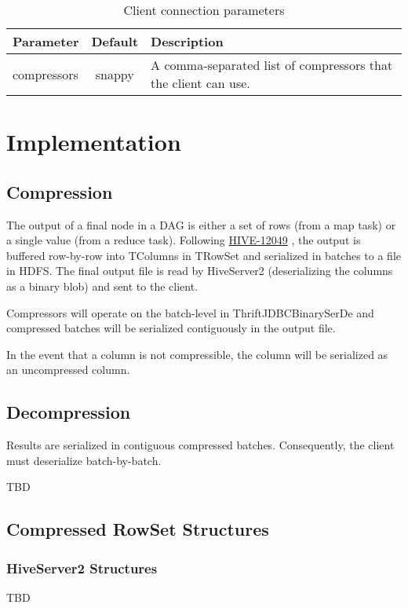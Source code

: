 \documentclass[11pt,a4paper]{article}
\begin{document}
		\begin{table}[H]
			\begin{tabular}{| p{3cm} | c | p{6.5cm} |} \hline
				\textbf{Parameter} & \textbf{Default} & \textbf{Description} \\ \hline
				compressors
				& snappy & A comma-separated list of compressors that the client can use. 
				\\ \hline
			\end{tabular}
			\caption{Client connection parameters}
		\end{table}
		
\section{Implementation}
	
	\subsection{Compression}
		The output of a final node in a DAG is either a set of rows (from a map task) or a single value (from a reduce task).
		Following
		\href{https://issues.apache.org/jira/browse/HIVE-12049}{HIVE-12049}
		, the output is buffered row-by-row into TColumns in TRowSet and serialized in batches to a file in HDFS.
		The final output file is read by HiveServer2 (deserializing the columns as a binary blob) and sent to the client.
		
		Compressors will operate on the batch-level in ThriftJDBCBinarySerDe and compressed batches will be serialized contiguously in the output file. 
		
		In the event that a column is not compressible, the column will be serialized as an uncompressed column.
		
	\subsection{Decompression}
		Results are serialized in contiguous compressed batches. Consequently, the client must deserialize batch-by-batch.
		
		TBD
		
	\subsection{Compressed RowSet Structures}
		\subsubsection{HiveServer2 Structures}
			TBD
		
\end{document}
